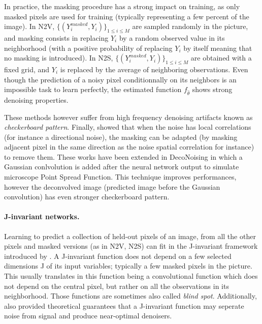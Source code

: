 \documentclass{article}
\begin{document}
In practice, the masking procedure has a strong impact on training, as only masked pixels are used for training (typically representing a few percent of the image). In N2V, $\{(Y^{masked}_i,Y_i)\}_{1\leqslant i\leqslant M}$ are sampled  randomly in the picture, and masking consists in replacing $Y_i$ by a random observed value in its neighborhood (with a positive probability of replacing $Y_i$ by itself meaning that no masking is introduced). In N2S,  $\{(Y^{masked}_i,Y_i)\}_{1\leqslant i\leqslant M}$ are obtained with  a fixed grid, and $Y_i$ is replaced by the average of neighboring observations. Even though the prediction of a noisy pixel conditionnally on its neighbors is an impossible task to learn perfectly, the estimated function $f_{\hat \theta}$ shows strong denoising properties.

These methods however suffer from high frequency denoising artifacts known as \textit{checkerboard pattern}. Finally, \cite{broaddus2020removing} showed that when the noise has  local correlations (for instance a  directional noise), the masking can be adapted (by masking adjacent pixel in the same direction as the noise spatial correlation for instance) to remove them. These works have been extended in DecoNoising \cite{goncharova2020} in which a Gaussian conlvolution is added after the neural network output to simulate microscope Point Spread Function. This technique improves performances, however the deconvolved image (predicted image before the Gaussian convolution) has even stronger checkerboard pattern.

\paragraph{J-invariant networks.}
Learning to predict a collection of held-out pixels of an image, from all the other pixels and masked versions (as in N2V, N2S) can fit in the J-invariant framework introduced by \cite{batson2019noise2self}.
A J-invariant function does not depend on a few selected dimensions J of its input variables; typically a few masked pixels
in the picture.
This usually translates in this function being a convolutional function which does not depend on the central pixel, but rather on all the observations in its neighborhood. Those functions are sometimes also called \textit{blind spot}.
 Additionally, \cite{batson2019noise2self} also provided theoretical guarantees that a J-invariant function may seperate noise from signal and produce near-optimal denoisers.
\end{document}
